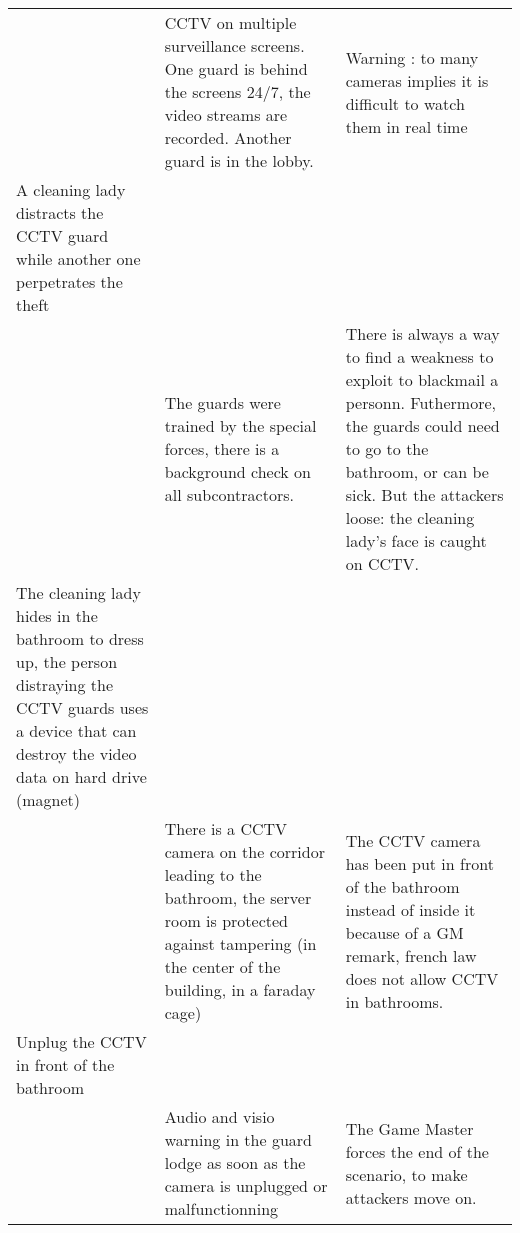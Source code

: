 \documentclass[11pt]{article} %
\begin{document}
\begin{longtable}{|p{4cm}|p{4cm}|p{4cm}|}
& CCTV on multiple surveillance screens. One guard is behind the screens 24/7,
the video streams are recorded. Another guard is in the lobby. & 
Warning : to many cameras implies it is difficult to watch them in real time \\
A cleaning lady distracts the CCTV guard while another one perpetrates the theft && \\
& The guards were trained by the special forces, there is a background check on all
subcontractors. & There is always a way to find a weakness to exploit to blackmail a personn. 
Futhermore, the guards could need to go to the bathroom, or can be sick. But the attackers loose: 
the cleaning lady's face is caught on CCTV. \\
The cleaning lady hides in the bathroom to dress up, the person distraying the CCTV guards 
uses a device that can destroy the video data on hard drive (magnet) && \\
& There is a CCTV camera on the corridor leading to the bathroom, the server room is
protected against tampering (in the center of the building, in a faraday cage) &
The CCTV camera has been put in front of the bathroom instead of inside it because 
of a GM remark, french law does not allow CCTV in bathrooms. \\
Unplug the CCTV in front of the bathroom & & \\
& Audio and visio warning in the guard lodge as soon as the camera is unplugged 
or malfunctionning & The Game Master forces the end of the scenario, to make attackers 
move on. \\
\end{longtable}
\end{document}
